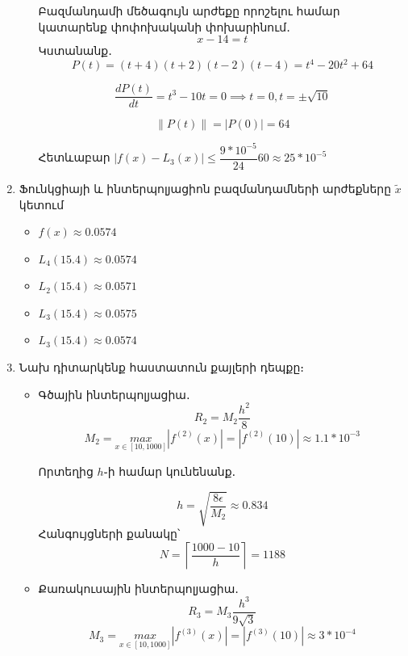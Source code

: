 \documentclass{article}
\begin{document}
\begin{enumerate}
\begin{itemize}
	Բազմանդամի մեծագույն արժեքը որոշելու համար կատարենք փոփոխականի փոխարինում․
												$$x - 14 = t$$
	Կստանանք․
				$$P\left(t\right) =  \left(t+4\right) \left(t+2\right) \left(t-2\right) \left(t-4\right) = t^{4} - 20 t^{2} + 64$$

				$$ \dfrac{d P\left(t\right)}{dt} = t^{3} - 10 t = 0 \implies t = 0, t = \pm \sqrt{10}$$

				$$\lVert P\left(t\right) \rVert= \left|P\left( 0   \right)\right| = 64$$

				Հետևաբար $|f\left(x\right) - L_{3}\left(x\right)| \leq \dfrac{9 * 10^{-5}}{24} 60 \approx 25 * 10^{-5}$


\end{itemize}

\item

	Ֆունկցիայի և ինտերպոլյացիոն բազմանդամների արժեքները $\tilde{x}$ կետում

\begin{itemize}

\item  
		$f\left(x\right) \approx 0.0574$
\item
		$L_{4}\left(15.4\right) \approx 0.0574$
\item
		$L_{2}\left(15.4\right) \approx 0.0571$
\item
		$L_{3}\left(15.4\right) \approx 0.0575$
\item
		$L_{3}\left(15.4\right) \approx 0.0574$

\end{itemize}


\item 
		Նախ դիտարկենք հաստատուն քայլերի դեպքը։

\begin{itemize}

\item
Գծային ինտերպոլյացիա․
				$$R_{2} = M_{2} \dfrac{h^{2}}{8}$$
				$$M_{2} = \underset{x \in \left[10, 1000\right]}{max}\left|f^{\left(2\right)}\left(x\right)\right| = \left|f^{\left(2\right)}\left(10\right)\right| \approx 1.1 * 10^{-3}$$

Որտեղից $h$֊ի համար կունենանք․

				$$ h = \sqrt{\dfrac{8 \epsilon}{M_{2}}} \approx 0.834$$
				Հանգույցների քանակը՝ $$N = \left \lceil{\dfrac{1000 - 10}{h}} \right \rceil = 1188$$
\item
Քառակուսային ինտերպոլյացիա․
				$$R_{3} = M_{3} \dfrac{h^{3}}{9 \sqrt{3}}$$
				$$M_{3} = \underset{x \in \left[10, 1000\right]}{max}\left|f^{\left(3\right)}\left(x\right)\right| = \left|f^{\left(3\right)}\left(10\right)\right| \approx 3 * 10^{-4}$$


\end{itemize}
\end{enumerate}
\end{document}

